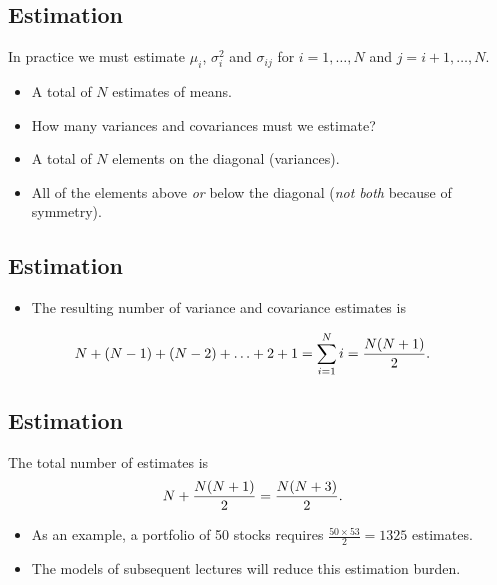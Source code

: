 \documentclass[letterpaper,10pt,english]{sphinxmanual}
\begin{document}
\subsection{Estimation}
\label{multiAssetOpt:estimation}
In practice we must estimate $\mu_i$, $\sigma^2_i$ and
$\sigma_{ij}$ for $i=1,\ldots,N$ and $j=i+1,\ldots,N$.
\begin{itemize}
\item {} 
A total of $N$ estimates of means.

\end{itemize}
\begin{itemize}
\item {} 
How many variances and covariances must we estimate?

\end{itemize}
\begin{itemize}
\item {} 
A total of $N$ elements on the diagonal (variances).

\end{itemize}
\begin{itemize}
\item {} 
All of the elements above \emph{or} below the diagonal (\emph{not both}
because of symmetry).

\end{itemize}


\subsection{Estimation}
\label{multiAssetOpt:id5}\begin{itemize}
\item {} 
The resulting number of variance and covariance estimates is

\end{itemize}
\begin{gather}
\begin{split}N + (N-1) + (N-2) + \ldots + 2 + 1 & = \sum_{i=1}^N i =
\frac{N(N+1)}{2}.\end{split}\notag
\end{gather}

\subsection{Estimation}
\label{multiAssetOpt:id6}
The total number of estimates is
\begin{gather}
\begin{split}N + \frac{N(N+1)}{2} & = \frac{N(N+3)}{2}.\end{split}\notag
\end{gather}\begin{itemize}
\item {} 
As an example, a portfolio of 50 stocks requires $\frac{50
\times 53}{2} = 1325$ estimates.

\end{itemize}
\begin{itemize}
\item {} 
The models of subsequent lectures will reduce this estimation
burden.

\end{itemize}
\end{document}
